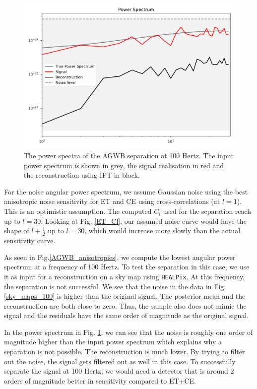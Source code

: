\begin{figure}
    \centering
    \includegraphics[width=0.8\linewidth]{Images/power_spectrum_100Hz_2D.png}
    \caption[The power spectra of the AGWB separation at 100 Hertz.]{The power spectra of the AGWB separation at 100 Hertz. The input power spectrum is shown in grey, the signal realisation in red and the reconstruction using IFT in black.}
    \label{100Hz_power_spectrum}
\end{figure} 

For the noise angular power spectrum, we assume Gaussian noise using the best anisotropic noise sensitivity for ET and CE using cross-correlations (at $l=1$). This is an optimistic assumption. The computed $C_l$ used for the separation reach up to $l=30$. Looking at Fig. \ref{ET_Cl}, our assumed noise curve would have the shape of $l+\frac{1}{2}$ up to $l=30$, which would increase more slowly than the actual sensitivity curve. 

As seen in Fig.\ref{AGWB_anisotropies}, we compute the lowest angular power spectrum at a frequency of 100 Hertz. To test the separation in this case, we use it as input for a reconstruction on a sky map using {\tt HEALPix}\cite{todo, healpix}. At this frequency, the separation is not successful. We see that the noise in the data in Fig.\ref{sky_maps_100} is higher than the original signal. The posterior mean and the reconstruction are both close to zero. Thus, the sample also does not mimic the signal and the residuals have the same order of magnitude as the original signal.

In the power spectrum in Fig. \ref{100Hz_power_spectrum}, we can see that the noise is roughly one order of magnitude higher than the input power spectrum which explains why a separation is not possible. The reconstruction is much lower. By trying to filter out the noise, the signal gets filtered out as well in this case. To successfully separate the signal at 100 Hertz, we would need a detector that is around 2 orders of magnitude better in sensitivity compared to ET+CE.

